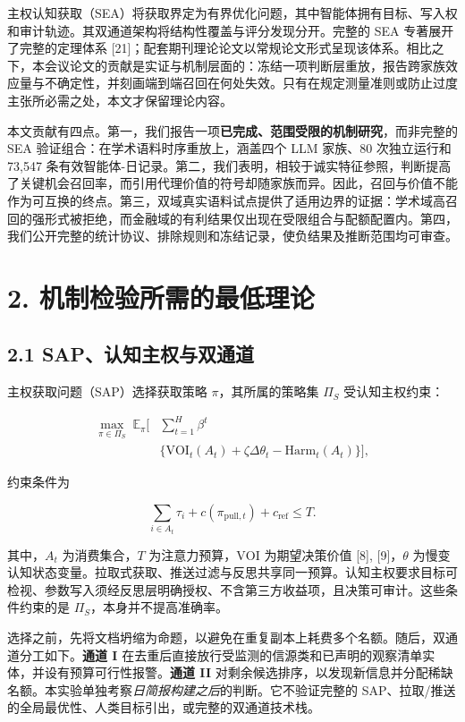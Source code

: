 \documentclass[
  chinese,
  conference,10pt]{IEEEtran}
\begin{document}
主权认知获取（SEA）将获取界定为有界优化问题，其中智能体拥有目标、写入权和审计轨迹。其双通道架构将结构性覆盖与评分发现分开。完整的 SEA 专著展开了完整的定理体系 {[}21{]}；配套期刊理论论文以常规论文形式呈现该体系。相比之下，本会议论文的贡献是实证与机制层面的：冻结一项判断层重放，报告跨家族效应量与不确定性，并刻画端到端召回在何处失效。只有在规定测量准则或防止过度主张所必需之处，本文才保留理论内容。

本文贡献有四点。第一，我们报告一项\textbf{已完成、范围受限的机制研究}，而非完整的 SEA 验证组合：在学术语料时序重放上，涵盖四个 LLM 家族、80 次独立运行和 73,547 条有效智能体-日记录。第二，我们表明，相较于诚实特征参照，判断提高了关键机会召回率，而引用代理价值的符号却随家族而异。因此，召回与价值不能作为可互换的终点。第三，双域真实语料试点提供了适用边界的证据：学术域高召回的强形式被拒绝，而金融域的有利结果仅出现在受限组合与配额配置内。第四，我们公开完整的统计协议、排除规则和冻结记录，使负结果及推断范围均可审查。

\section{2. 机制检验所需的最低理论}\label{ux673aux5236ux68c0ux9a8cux6240ux9700ux7684ux6700ux4f4eux7406ux8bba}

\subsection{2.1 SAP、认知主权与双通道}\label{sapux8ba4ux77e5ux4e3bux6743ux4e0eux53ccux901aux9053}

主权获取问题（SAP）选择获取策略 \(\pi\)，其所属的策略集 \(\Pi_S\) 受认知主权约束：

\[
\begin{aligned}
\max_{\pi\in\Pi_S}\;\mathbb{E}_{\pi}\!\Bigg[&\sum_{t=1}^{H}\beta^t\\
&\{\mathrm{VOI}_t(A_t)+\zeta\Delta\theta_t-\mathrm{Harm}_t(A_t)\}\Bigg],
\end{aligned}
\]

约束条件为

\[
\sum_{i\in A_t}\tau_i+c(\pi_{\mathrm{pull},t})+c_{\mathrm{ref}}\le T .
\]

其中，\(A_t\) 为消费集合，\(T\) 为注意力预算，\(\mathrm{VOI}\) 为期望决策价值 {[}8{]}, {[}9{]}，\(\theta\) 为慢变认知状态变量。拉取式获取、推送过滤与反思共享同一预算。认知主权要求目标可检视、参数写入须经反思层明确授权、不含第三方收益项，且决策可审计。这些条件约束的是 \(\Pi_S\)，本身并不提高准确率。

选择之前，先将文档坍缩为命题，以避免在重复副本上耗费多个名额。随后，双通道分工如下。\textbf{通道 I} 在去重后直接放行受监测的信源类和已声明的观察清单实体，并设有预算可行性报警。\textbf{通道 II} 对剩余候选排序，以发现新信息并分配稀缺名额。本实验单独考察\emph{日简报构建之后}的判断。它不验证完整的 SAP、拉取/推送的全局最优性、人类目标引出，或完整的双通道技术栈。
\end{document}
